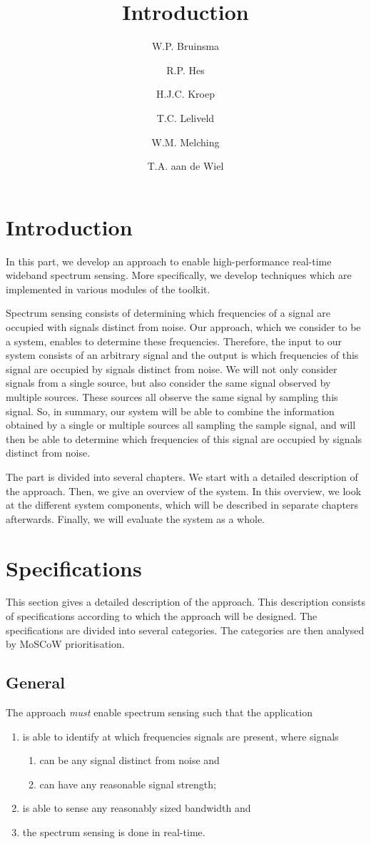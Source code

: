 \documentclass[a4paper, openany, oneside]{memoir}
\title{Introduction}
\author{W.P. Bruinsma \and R.P. Hes \and H.J.C. Kroep \and T.C. Leliveld \and W.M. Melching \and T.A. aan de Wiel}
\begin{document}
\section{Introduction}
In this part, we develop an approach to enable high-performance real-time wideband spectrum sensing. More specifically, we develop techniques which are implemented in various modules of the toolkit.

Spectrum sensing consists of determining which frequencies of a signal are occupied with signals distinct from noise. Our approach, which we consider to be a system, enables to determine these frequencies. Therefore, the input to our system consists of an arbitrary signal and the output is which frequencies of this signal are occupied by signals distinct from noise. We will not only consider signals from a single source, but also consider the same signal observed by multiple sources. These sources all observe the same signal by sampling this signal. So, in summary, our system will be able to combine the information obtained by a single or multiple sources all sampling the sample signal, and will then be able to determine which frequencies of this signal are occupied by signals distinct from noise.

The part is divided into several chapters. We start with a detailed description of the approach. Then, we give an overview of the system. In this overview, we look at the different system components, which will be described in separate chapters afterwards. Finally, we will evaluate the system as a whole.

\section{Specifications}
\label{sec:theory-specs}
This section gives a detailed description of the approach. This description consists of specifications according to which the approach will be designed. The specifications are divided into several categories. The categories are then analysed by MoSCoW prioritisation.

\subsection{General}
The approach \emph{must} enable spectrum sensing such that the application
\begin{enumerate}
    \item is able to identify at which frequencies signals are present, where signals
    \begin{enumerate}
        \item can be any signal distinct from noise and
        \item can have any reasonable signal strength;
    \end{enumerate}
    \item is able to sense any reasonably sized bandwidth and
    \item the spectrum sensing is done in real-time.
\end{enumerate}
\end{document}
